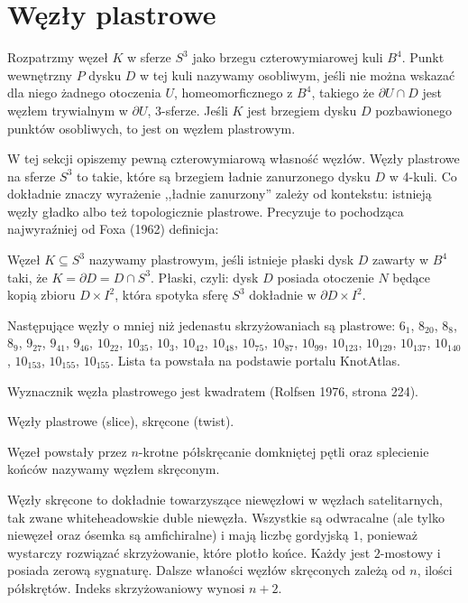 \section{Węzły plastrowe} %
\label{sec:slice}
Rozpatrzmy węzeł $K$ w sferze $S^3$ jako brzegu czterowymiarowej kuli $B^4$.
Punkt wewnętrzny $P$ dysku $D$ w tej kuli nazywamy osobliwym, jeśli nie można wskazać dla niego żadnego otoczenia $U$, homeomorficznego z $B^4$, takiego że $\partial U \cap D$ jest węzłem trywialnym w $\partial U$, 3-sferze.
Jeśli $K$ jest brzegiem dysku $D$ pozbawionego punktów osobliwych, to jest on węzłem plastrowym.


W tej sekcji opiszemy pewną czterowymiarową własność węzłów.
Węzły plastrowe na sferze $S^3$ to takie, które są brzegiem ładnie zanurzonego dysku $D$ w 4-kuli.
Co dokładnie znaczy wyrażenie ,,ładnie zanurzony'' zależy od kontekstu: istnieją węzły gładko albo też topologicznie plastrowe.
Precyzuje to pochodząca najwyraźniej od Foxa (1962) definicja:

\begin{definition}
    Węzeł $K \subseteq S^3$ nazywamy plastrowym, jeśli istnieje płaski dysk $D$ zawarty w $B^4$ taki, że $K = \partial D = D \cap S^3$.
    Płaski, czyli: dysk $D$ posiada otoczenie $N$ będące kopią zbioru $D \times I^2$, która spotyka sferę $S^3$ dokładnie w $\partial D \times I^2$.
\end{definition}

Następujące węzły o mniej niż jedenastu skrzyżowaniach są plastrowe: $6_1$, $8_{20}$, $8_{8}$, $8_{9}$, $9_{27}$, $9_{41}$, $9_{46}$, $10_{22}$, $10_{35}$, $10_{3}$, $10_{42}$, $10_{48}$, $10_{75}$, $10_{87}$, $10_{99}$, $10_{123}$, $10_{129}$, $10_{137}$, $10_{140}$, $10_{153}$, $10_{155}$, $10_{155}$.
Lista ta powstała na podstawie portalu KnotAtlas.

\begin{proposition} \label{slice_square_det}
    Wyznacznik węzła plastrowego jest kwadratem (Rolfsen 1976, strona 224).
\end{proposition}

Węzły plastrowe (slice), skręcone (twist).

\begin{definition} \label{twist_knots}
    Węzeł powstały przez $n$-krotne półskręcanie domkniętej pętli oraz splecienie końców nazywamy węzłem skręconym. 
\end{definition}

Węzły skręcone to dokładnie towarzyszące niewęzłowi w węzłach satelitarnych, tak zwane whiteheadowskie duble niewęzła.
Wszystkie są odwracalne (ale tylko niewęzeł oraz ósemka są amfichiralne) i mają liczbę gordyjską $1$, ponieważ wystarczy rozwiązać skrzyżowanie, które plotło końce.
Każdy jest $2$-mostowy i posiada zerową sygnaturę.
Dalsze właności węzłów skręconych zależą od $n$, ilości półskrętów.
Indeks skrzyżowaniowy wynosi $n + 2$.

